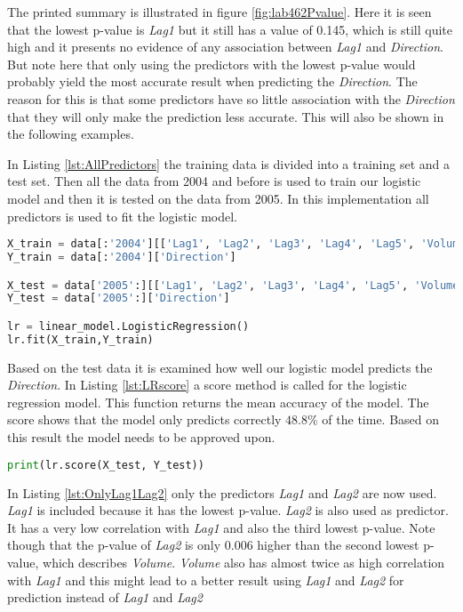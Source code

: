 The printed summary is illustrated in figure \ref{fig:lab462Pvalue}. Here it is  seen that the lowest p-value is \emph{Lag1} but it still has a value of 0.145, which is still quite high and it presents no evidence of any association between \emph{Lag1} and \emph{Direction}. But note here that only using the predictors with the lowest p-value would probably yield the most accurate result when predicting the \emph{Direction}. The reason for this is that some predictors have so little association with the \emph{Direction} that they will only make the prediction less accurate. This will also be shown in the following examples.


In Listing \ref{lst:AllPredictors} the training data is divided into a training set and a test set. Then all the data from 2004 and before is used to train our logistic model and then it is tested on the data from 2005. In this implementation all predictors is used to fit the logistic model.

\begin{lstlisting}[language=Python, label=lst:AllPredictors, caption=Logistic regression using all predictors]
X_train = data[:'2004'][['Lag1', 'Lag2', 'Lag3', 'Lag4', 'Lag5', 'Volume']]
Y_train = data[:'2004']['Direction']

X_test = data['2005':][['Lag1', 'Lag2', 'Lag3', 'Lag4', 'Lag5', 'Volume']]
Y_test = data['2005':]['Direction']

lr = linear_model.LogisticRegression()
lr.fit(X_train,Y_train)
\end{lstlisting}

Based on the test data it is examined how well our logistic model predicts the \emph{Direction}. In Listing \ref{lst:LRscore} a score method is called for the logistic regression model. This function returns the mean accuracy of the model. The score shows that the model only predicts correctly $48.8\%$ of the time. Based on this result the model needs to be approved upon.
\begin{lstlisting}[language=Python, label=lst:LRscore, caption=Print mean accuracy]
print(lr.score(X_test, Y_test))
\end{lstlisting}

In Listing \ref{lst:OnlyLag1Lag2} only the predictors \emph{Lag1} and \emph{Lag2} are now used. \emph{Lag1} is included because it has the lowest p-value. \emph{Lag2} is also used as predictor. It has a very low correlation with \emph{Lag1} and also the third lowest p-value. Note though that the p-value of \emph{Lag2} is only 0.006 higher than the second lowest p-value, which describes \emph{Volume}. \emph{Volume} also has almost twice as high correlation with \emph{Lag1} and this might lead to a better result using \emph{Lag1} and \emph{Lag2} for prediction instead of \emph{Lag1} and \emph{Lag2}

